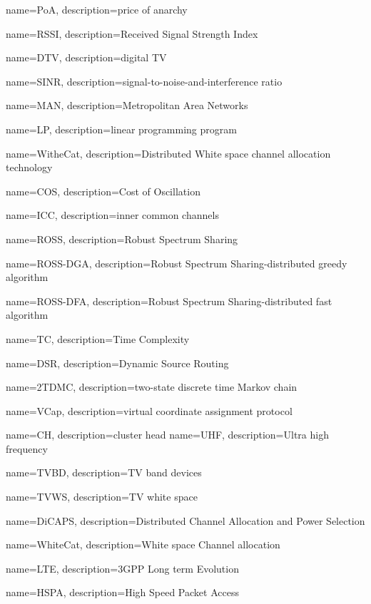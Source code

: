 {
    name=PoA,
    description={price of anarchy}
}


{
    name=RSSI,
    description={Received Signal Strength Index}
}


{
    name=DTV,
    description={digital TV}
}

{
    name=SINR,
    description={signal-to-noise-and-interference ratio}
}

{
    name=MAN,
    description={Metropolitan Area Networks}
}

{
    name=LP,
    description={linear programming program}
}

{
    name=WitheCat,
    description={Distributed White space channel allocation technology}
}

{
    name=COS,
    description={Cost of Oscillation}
}

{
    name=ICC,
    description={inner common channels}
}

{
    name=ROSS,
    description={Robust Spectrum Sharing}
}

{
    name=ROSS-DGA,
    description={Robust Spectrum Sharing-distributed greedy algorithm}
}

{
    name=ROSS-DFA,
    description={Robust Spectrum Sharing-distributed fast algorithm}
}


{
    name=TC,
    description={Time Complexity}
}

{
    name=DSR,
    description={Dynamic Source Routing}
}

{
    name=2TDMC,
    description={two-state discrete time Markov chain}
}

{
    name=VCap,
    description={virtual coordinate assignment protocol}
}


{
    name=CH,
    description={cluster head}
}
{
    name=UHF,
    description={Ultra high frequency}
}


{
    name=TVBD,
    description={TV band devices}
}

{
    name=TVWS,
    description={TV white space}
}

{
    name=DiCAPS,
    description={Distributed Channel Allocation and Power Selection}
}

{
    name=WhiteCat,
    description={White space Channel allocation}
}

{
    name=LTE,
    description={3GPP Long term Evolution}
}

{
    name=HSPA,
    description={High Speed Packet Access}
}
